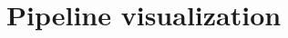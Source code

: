 \documentclass[pdftex,12pt,a4paper]{report}
\begin{document}



\section{Pipeline visualization}
\end{document}
